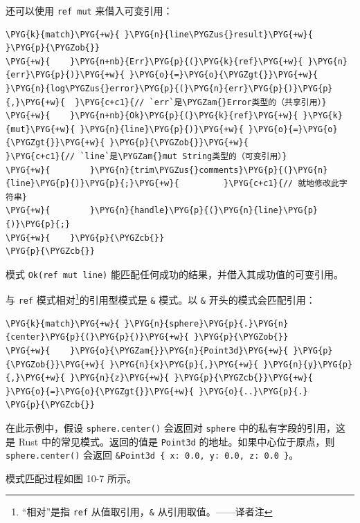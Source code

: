 还可以使用 \texttt{ref mut} 来借入可变引用：

\begin{Verbatim}[commandchars=\\\{\},breaklines=true,breakanywhere=true,fontsize=\codefont,xleftmargin=17bp]
\PYG{k}{match}\PYG{+w}{ }\PYG{n}{line\PYGZus{}result}\PYG{+w}{ }\PYG{p}{\PYGZob{}}
\PYG{+w}{    }\PYG{n+nb}{Err}\PYG{p}{(}\PYG{k}{ref}\PYG{+w}{ }\PYG{n}{err}\PYG{p}{)}\PYG{+w}{ }\PYG{o}{=}\PYG{o}{\PYGZgt{}}\PYG{+w}{ }\PYG{n}{log\PYGZus{}error}\PYG{p}{(}\PYG{n}{err}\PYG{p}{)}\PYG{p}{,}\PYG{+w}{  }\PYG{c+c1}{// `err`是\PYGZam{}Error类型的（共享引用）}
\PYG{+w}{    }\PYG{n+nb}{Ok}\PYG{p}{(}\PYG{k}{ref}\PYG{+w}{ }\PYG{k}{mut}\PYG{+w}{ }\PYG{n}{line}\PYG{p}{)}\PYG{+w}{ }\PYG{o}{=}\PYG{o}{\PYGZgt{}}\PYG{+w}{ }\PYG{p}{\PYGZob{}}\PYG{+w}{            }\PYG{c+c1}{// `line`是\PYGZam{}mut String类型的（可变引用）}
\PYG{+w}{        }\PYG{n}{trim\PYGZus{}comments}\PYG{p}{(}\PYG{n}{line}\PYG{p}{)}\PYG{p}{;}\PYG{+w}{         }\PYG{c+c1}{// 就地修改此字符串}
\PYG{+w}{        }\PYG{n}{handle}\PYG{p}{(}\PYG{n}{line}\PYG{p}{)}\PYG{p}{;}
\PYG{+w}{    }\PYG{p}{\PYGZcb{}}
\PYG{p}{\PYGZcb{}}
\end{Verbatim}

模式 \texttt{Ok(ref mut line)} 能匹配任何成功的结果，并借入其成功值的可变引用。

与 \texttt{ref} 模式相对\footnote{“相对”是指 \texttt{ref} 从值取引用，\texttt{\&} 从引用取值。——译者注}的引用型模式是 \texttt{\&} 模式。以 \texttt{\&} 开头的模式会匹配引用：

\begin{Verbatim}[commandchars=\\\{\},breaklines=true,breakanywhere=true,fontsize=\codefont,xleftmargin=17bp]
\PYG{k}{match}\PYG{+w}{ }\PYG{n}{sphere}\PYG{p}{.}\PYG{n}{center}\PYG{p}{(}\PYG{p}{)}\PYG{+w}{ }\PYG{p}{\PYGZob{}}
\PYG{+w}{    }\PYG{o}{\PYGZam{}}\PYG{n}{Point3d}\PYG{+w}{ }\PYG{p}{\PYGZob{}}\PYG{+w}{ }\PYG{n}{x}\PYG{p}{,}\PYG{+w}{ }\PYG{n}{y}\PYG{p}{,}\PYG{+w}{ }\PYG{n}{z}\PYG{+w}{ }\PYG{p}{\PYGZcb{}}\PYG{+w}{ }\PYG{o}{=}\PYG{o}{\PYGZgt{}}\PYG{+w}{ }\PYG{o}{..}\PYG{p}{.}
\PYG{p}{\PYGZcb{}}
\end{Verbatim}

在此示例中，假设 \texttt{sphere.center()} 会返回对 \texttt{sphere} 中的私有字段的引用，这是 Rust 中的常见模式。返回的值是 \texttt{Point3d} 的地址。如果中心位于原点，则 \texttt{sphere.center()} 会返回 \texttt{\&Point3d \{ x: 0.0, y: 0.0, z: 0.0 \}}。

模式匹配过程如图 10-7 所示。

